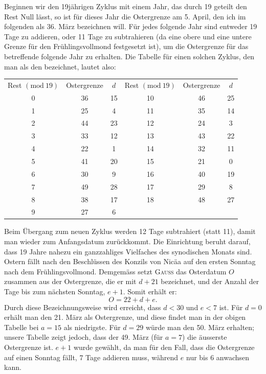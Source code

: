 Beginnen wir den 19jährigen Zyklus mit einem Jahr, das durch 19 geteilt den Rest Null lässt, so ist für dieses Jahr die Ostergrenze am 5. April,
den ich im folgenden als 36. März bezeichnen will. Für jedes folgende Jahr
sind entweder 19 Tage zu addieren, oder 11 Tage zu subtrahieren (da eine
obere und eine untere Grenze für den Frühlingsvollmond festgesetzt ist), um
die Ostergrenze für das betreffende folgende Jahr zu erhalten. Die Tabelle
für einen solchen Zyklus, den man als den  bezeichnet,
lautet also:
\begin{center}\small\setlength{\tabcolsep}{6pt}
\begin{tabular}{c|c|c||c|c|c}
Rest $(\mathrm{mod}\ 19)$ & Ostergrenze & $d$ & Rest $(\mathrm{mod}\ 19)$ & Ostergrenze & $d$\\
0&36&15&10&46&25\\
1&25&4&11&35&14\\
2&44&23&12&24&3\\
3&33&12&13&43&22\\
4&22&1&14&32&11\\
5&41&20&15&21&0\\
6&30&9&16&40&19\\
7&49&28&17&29&8\\
8&38&17&18&48&27\\
9&27&6&&&
\end{tabular}\end{center}
\noindent\hspace*{\parindent}Beim Übergang zum neuen Zyklus werden 12 Tage subtrahiert (statt 11),
damit man wieder zum Anfangsdatum zurückkommt. Die Einrichtung beruht
\clearpage{}
\noindent darauf, dass 19 Jahre nahezu ein ganzzahliges Vielfaches des synodischen
Monats sind. Ostern fällt nach den Beschlüssen des Konzils von Nicäa auf
den ersten Sonntag nach dem Frühlingsvollmond. Demgemäss setzt \textsc{Gauss}
das Osterdatum $O$ zusammen aus der Ostergrenze, die er mit $d+21$ bezeichnet,
und der Anzahl der Tage bis zum nächsten Sonntag, $e+1$. Somit erhält er:
\[
O=22+d+e.
\]
\noindent Durch diese Bezeichnungsweise wird erreicht, dass $d<30$ und $e<7$ ist.
Für $d=0$ erhält man den 21. März als Ostergrenze, und diese findet man
in der obigen Tabelle bei $a=15$ als niedrigste. Für $d=29$ würde man
den 50. März erhalten; unsere Tabelle zeigt jedoch, dass der 49. März (für
$a=7$) die äusserste Ostergrenze ist. $e+1$ wurde gewählt, da man für den
Fall, dass die Ostergrenze auf einen Sonntag fällt, 7 Tage addieren muss,
während $e$ nur bis 6 anwachsen kann.


